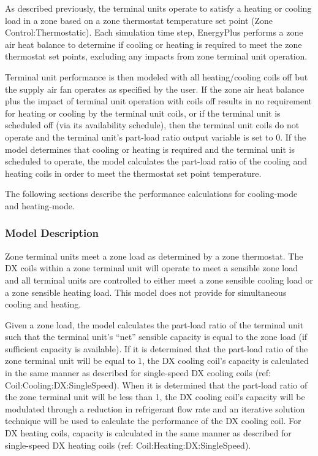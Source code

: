 As described previously, the terminal units operate to satisfy a heating or cooling load in a zone based on a zone thermostat temperature set point (Zone Control:Thermostatic). Each simulation time step, EnergyPlus performs a zone air heat balance to determine if cooling or heating is required to meet the zone thermostat set points, excluding any impacts from zone terminal unit operation.

Terminal unit performance is then modeled with all heating/cooling coils off but the supply air fan operates as specified by the user. If the zone air heat balance plus the impact of terminal unit operation with coils off results in no requirement for heating or cooling by the terminal unit coils, or if the terminal unit is scheduled off (via its availability schedule), then the terminal unit coils do not operate and the terminal unit's part-load ratio output variable is set to 0. If the model determines that cooling or heating is required and the terminal unit is scheduled to operate, the model calculates the part-load ratio of the cooling and heating coils in order to meet the thermostat set point temperature.

The following sections describe the performance calculations for cooling-mode and heating-mode.

\subsubsection{Model Description}\label{model-description-4-002}

Zone terminal units meet a zone load as determined by a zone thermostat. The DX coils within a zone terminal unit will operate to meet a sensible zone load and all terminal units are controlled to either meet a zone sensible cooling load or a zone sensible heating load. This model does not provide for simultaneous cooling and heating.

Given a zone load, the model calculates the part-load ratio of the terminal unit such that the terminal unit's ``net'' sensible capacity is equal to the zone load (if sufficient capacity is available). If it is determined that the part-load ratio of the zone terminal unit will be equal to 1, the DX cooling coil's capacity is calculated in the same manner as described for single-speed DX cooling coils (ref: Coil:Cooling:DX:SingleSpeed). When it is determined that the part-load ratio of the zone terminal unit will be less than 1, the DX cooling coil's capacity will be modulated through a reduction in refrigerant flow rate and an iterative solution technique will be used to calculate the performance of the DX cooling coil. For DX heating coils, capacity is calculated in the same manner as described for single-speed DX heating coils (ref: Coil:Heating:DX:SingleSpeed).

